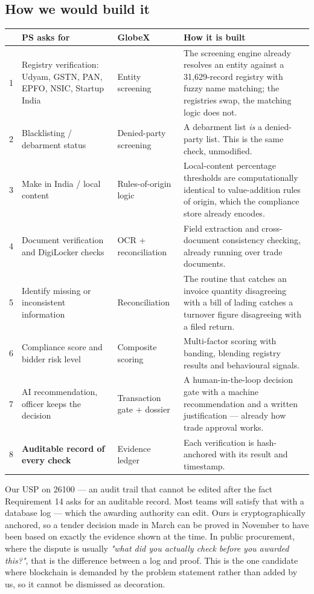 \documentclass[11pt]{article}
\begin{document}
\subsection*{How we would build it}
\renewcommand{\arraystretch}{1.35}
\noindent\begin{longtable}{@{}p{0.5cm}p{4.5cm}p{2.0cm}p{8.6cm}@{}}
\toprule
& \textbf{PS asks for} & \textbf{GlobeX} & \textbf{How it is built} \\
\midrule
\endhead
1 & Registry verification: Udyam, GSTN, PAN, EPFO, NSIC, Startup India & Entity screening & The screening engine already resolves an entity against a 31{,}629-record registry with fuzzy name matching; the registries swap, the matching logic does not. \\
2 & Blacklisting / debarment status & Denied-party screening & A debarment list \emph{is} a denied-party list. This is the same check, unmodified. \\
3 & Make in India / local content & Rules-of-origin logic & Local-content percentage thresholds are computationally identical to value-addition rules of origin, which the compliance store already encodes. \\
4 & Document verification and DigiLocker checks & OCR + reconciliation & Field extraction and cross-document consistency checking, already running over trade documents. \\
5 & Identify missing or inconsistent information & Reconciliation & The routine that catches an invoice quantity disagreeing with a bill of lading catches a turnover figure disagreeing with a filed return. \\
6 & Compliance score and bidder risk level & Composite scoring & Multi-factor scoring with banding, blending registry results and behavioural signals. \\
7 & AI recommendation, officer keeps the decision & Transaction gate + dossier & A human-in-the-loop decision gate with a machine recommendation and a written justification --- already how trade approval works. \\
8 & \textbf{Auditable record of every check} & Evidence ledger & Each verification is hash-anchored with its result and timestamp. \\
\bottomrule
\end{longtable}

\begin{uspbox}{Our USP on 26100 --- an audit trail that cannot be edited after the fact}
Requirement 14 asks for an auditable record. Most teams will satisfy that with a database log --- which
the awarding authority can edit. Ours is cryptographically anchored, so a tender decision made in March
can be proved in November to have been based on exactly the evidence shown at the time. In public
procurement, where the dispute is usually \emph{"what did you actually check before you awarded this?"},
that is the difference between a log and proof. This is the one candidate where blockchain is demanded by
the problem statement rather than added by us, so it cannot be dismissed as decoration.
\end{uspbox}
\end{document}
